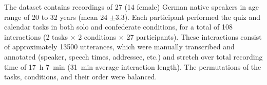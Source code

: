 The dataset contains recordings of 27 (14 female) German native speakers in age range of 20 to 32 years (mean 24 $\pm$3.3).
Each participant performed the quiz and calendar tasks in both solo and confederate conditions, for a total of 108 interactions (2 tasks $\times$ 2 conditions $\times$ 27 participants).
These interactions consist of approximately \num{13500} utterances, which were manually transcribed and annotated (speaker, speech times, addressee, etc.) and stretch over total recording time of \SI{17}{\hour} \SI{7}{\minute} (\SI{31}{\minute} average interaction length).
The permutations of the tasks, conditions, and their order were balanced.




